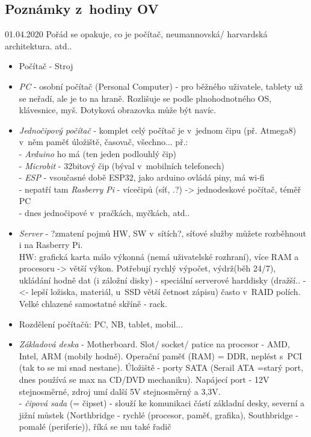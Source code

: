 \documentclass[12pt]{article}
\begin{document}
\subsection{Poznámky z~hodiny OV}
01.04.2020
Pořád se opakuje, co je počítač, neumannovská/ harvardská architektura. atd..\\
\begin{itemize}
\item Počítač  - Stroj
\item \emph{PC} - osobní počítač (Personal Computer) - pro běžného uživatele, tablety už se neřadí, ale je to na hraně. Rozlišuje se podle plnohodnotného OS, klávesnice, myš. Dotyková obrazovka může být navíc.
\item \emph{Jednočipový počítač} - komplet celý počítač je v~jednom čipu (př. Atmega8) v~něm paměť úložiště, časovač, všechno... př.:\\
 - \emph{Arduino} ho má (ten jeden podlouhlý čip)\\
 - \emph{Microbit} - 32bitový čip (býval v~mobilních telefonech)\\
 - \emph{ESP} - vsoučasné době ESP32, jako arduino ovládá piny, má wi-fi\\
 - nepatří tam \emph{Rasberry Pi} - vícečipů (síť, .?) -> jednodeskové počítač, téměř PC\\
 - dnes jednočipové v~pračkách, myčkách, atd.. 
\item \emph{Server} - ?zmatení pojmů HW, SW v~sítích?, síťové služby můžete rozběhnout i na Rasberry Pi. \\ HW: grafická karta málo výkonná (nemá uživatelské rozhraní), více RAM a procesoru -> větší výkon. Potřebují rychlý výpočet, výdrž(běh 24/7), ukládání hodně dat (i záložní disky) - speciální serverové harddisky (dražší.. -<- lepší ložiska, materiál, u~SSD větší četnost zápisu)  často v~RAID polích. Velké chlazené samostatné skříně - rack.
\item Rozdělení počítačů: PC, NB, tablet, mobil...
\item \emph{Základová deska} - Motherboard. Slot/ socket/ patice na procesor - AMD, Intel, ARM (mobily hodně). Operační paměť (RAM) = DDR, neplést s~PCI (tak to se mi snad nestane). Úložiště - porty SATA (Serail ATA  =starý port, dnes používá se max na CD/DVD mechaniku). Napájecí port - 12V stejnosměrné, zdroj umí další 5V stejnosměrný a 3,3V.\\
 - \emph{čipová sada} (= čipset) - slouží ke komunikaci částí základní desky, severní a jižní můstek (Northbridge - rychlé (procesor, paměť, grafika), Southbridge - pomalé (periferie)), říká se mu také řadič\\

\end{itemize}
\end{document}
